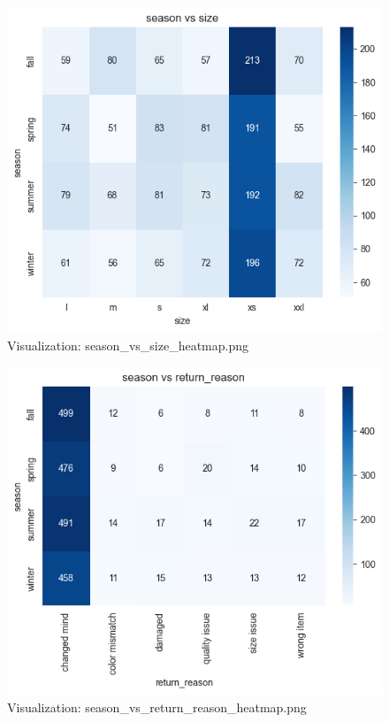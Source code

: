 \documentclass{article}%
\begin{document}
\vspace{10pt}%
\\%
\begin{minipage}[c]{0.48\textwidth}%


\begin{figure}[H]%
\centering%
\includegraphics[width=\linewidth]{output/plots/season_vs_size_heatmap.png}%
\caption{Visualization: season\_vs\_size\_heatmap.png}%
\end{figure}

%
\end{minipage}%
\begin{minipage}[c]{0.48\textwidth}%


\begin{figure}[H]%
\centering%
\includegraphics[width=\linewidth]{output/plots/season_vs_return_reason_heatmap.png}%
\caption{Visualization: season\_vs\_return\_reason\_heatmap.png}%
\end{figure}

%
\end{minipage}%
\end{document}
